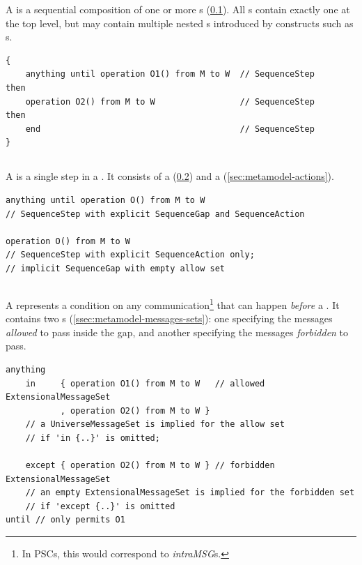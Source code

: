A \msubsequence{} is a sequential composition of one or more \msequencestep s
(\cref{ssec:metamodel-sequences-steps}).
All \msequence s contain exactly one \msubsequence{} at the top level, but
may contain multiple nested \msubsequence s introduced by constructs such as
\mloopaction s.

\begin{lstlisting}[style=Example]
{
    anything until operation O1() from M to W  // SequenceStep
then
    operation O2() from M to W                 // SequenceStep
then
    end                                        // SequenceStep
}
\end{lstlisting}

\subsection{\msequencestep}\label{ssec:metamodel-sequences-steps}

A \msequencestep{} is a single step in a \msubsequence.  It consists of a
\msequencegap{} (\cref{ssec:metamodel-sequences-gaps}) and a
\msequenceaction{} (\cref{sec:metamodel-actions}).

\begin{lstlisting}[style=Example]
anything until operation O() from M to W
// SequenceStep with explicit SequenceGap and SequenceAction

operation O() from M to W
// SequenceStep with explicit SequenceAction only;
// implicit SequenceGap with empty allow set
\end{lstlisting}

\subsection{\msequencegap}\label{ssec:metamodel-sequences-gaps}

A \msequencegap{} represents a condition on any
communication\footnote{In PSCs, this would correspond to
  \emph{intraMSG}s.} that can happen \emph{before} a \msequenceaction.
It contains two \mmessageset s (\cref{ssec:metamodel-messages-sets}):
one specifying the messages \emph{allowed} to pass inside the gap, and
another specifying the messages \emph{forbidden} to pass.

\begin{lstlisting}[style=Example]
anything
    in     { operation O1() from M to W   // allowed ExtensionalMessageSet
           , operation O2() from M to W }
    // a UniverseMessageSet is implied for the allow set
    // if 'in {..}' is omitted;

    except { operation O2() from M to W } // forbidden ExtensionalMessageSet
    // an empty ExtensionalMessageSet is implied for the forbidden set
    // if 'except {..}' is omitted
until // only permits O1
\end{lstlisting}

